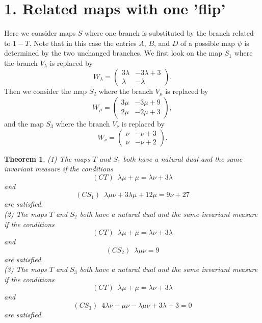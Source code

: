 \documentclass[12pt]{article}
\newtheorem{theorem}{Theorem}
\begin{document}
\section*{1. Related maps with one 'flip'}
	Here we consider maps $S$ where one branch is substituted by the branch related to $1-T$. Note that in this case the entries $A$, $B$, and $D$ of a possible map $\psi$ is determined by the two unchanged branches.  We first look on the map $S_1$ where the branch $V_\lambda$ is replaced by $$W_\lambda = \left( \begin{array}{cc} 3 \lambda &  -3 \lambda +3
		\\ \lambda & - \lambda \end{array} \right) .$$ Then we consider the map $S_2$ where the branch $V_\mu$ is replaced by $$W_\mu = \left( \begin{array}{cc} 3 \mu &  -3\mu +9
		\\ 2 \mu & - 2 \mu +3 \end{array} \right),$$ and the map $S_3$ where the branch $V_\nu$ is replaced by $$W_\nu = \left( \begin{array}{cc} \nu  &  -\nu +3
		\\ \nu & -\nu +2 \end{array} \right).$$
	\begin{theorem}
		(1) The maps $T$ and $S_1$ both have a natural dual and the same invariant measure if the conditions 
		$$(CT) \, \, \, \lambda \mu + \mu = \lambda \nu + 3 \lambda$$ and
		$$(CS_1) \, \, \, \lambda \mu \nu + 3 \lambda \mu + 12 \mu = 9 \nu +27$$
	are satisfied.	\\
		(2) The maps $T$ and $S_2$ both have a natural dual and the same invariant measure if the conditions 
	$$(CT) \, \, \, \lambda \mu + \mu = \lambda \nu + 3 \lambda$$ and
	$$(CS_2) \, \, \, \lambda \mu \nu = 9 $$
	are satisfied.	\\	
		(3) The maps $T$ and $S_3$ both have a natural dual and the same invariant measure if the conditions 
	$$(CT) \, \, \, \lambda \mu + \mu = \lambda \nu + 3 \lambda$$ and
	$$(CS_3) \, \, \, 4 \lambda \nu - \mu \nu - \lambda \mu \nu + 3 \lambda +3 = 0$$
	are satisfied.			
	\end{theorem} 
\end{document}
